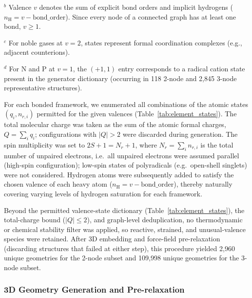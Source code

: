 \documentclass[fleqn,10pt]{article}
\begin{document}
\begin{table}[htbp]
\begin{minipage}{\linewidth}
$^{b}$ Valence $v$ denotes the sum of explicit bond orders and implicit hydrogens ($n_{\mathrm{H}} = v - \mathrm{bond\_order}$). Since every node of a connected graph has at least one bond, $v \geq 1$.

$^{c}$ For noble gases at $v=2$, states represent formal coordination complexes (e.g., adjacent counterions).

$^{d}$ For N and P at $v=1$, the $(+1,1)$ entry corresponds to a radical cation state present in the generator dictionary (occurring in 118 2-node and 2,845 3-node representative structures).
\end{minipage}
\end{table}

For each bonded framework, we enumerated all combinations of the atomic states $(q_i, n_{r,i})$ permitted for the given valences (Table~\ref{tab:element_states}). The total molecular charge was taken as the sum of the atomic formal charges, $Q = \sum_i q_i$; configurations with $|Q| > 2$ were discarded during generation. The spin multiplicity was set to $2S+1 = N_r + 1$, where $N_r = \sum_i n_{r,i}$ is the total number of unpaired electrons, i.e.\ all unpaired electrons were assumed parallel (high-spin configuration); low-spin states of polyradicals (e.g.\ open-shell singlets) were not considered. Hydrogen atoms were subsequently added to satisfy the chosen valence of each heavy atom ($n_{\mathrm{H}} = v - \mathrm{bond\_order}$), thereby naturally covering varying levels of hydrogen saturation for each framework.

Beyond the permitted valence-state dictionary (Table~\ref{tab:element_states}), the total-charge bound ($|Q| \le 2$), and graph-level deduplication, no thermodynamic or chemical stability filter was applied, so reactive, strained, and unusual-valence species were retained. After 3D embedding and force-field pre-relaxation (discarding structures that failed at either step), this procedure yielded 2,960 unique geometries for the 2-node subset and 109,998 unique geometries for the 3-node subset.

\subsubsection*{3D Geometry Generation and Pre-relaxation}
\end{document}
